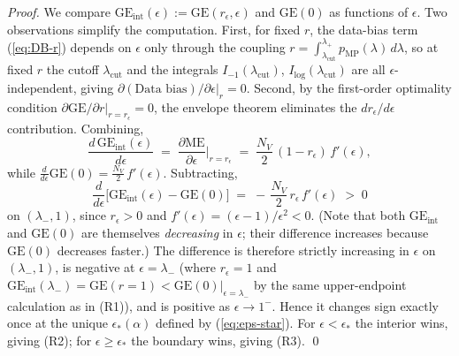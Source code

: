 \documentclass[10pt,a4paper]{amsart}
\newcommand{\NV}{N_V}
\begin{document}
\begin{proof}
We compare $\mathrm{GE}_{\mathrm{int}}(\epsilon) :=
\mathrm{GE}(r_{\epsilon},\epsilon)$ and $\mathrm{GE}(0)$ as
functions of $\epsilon$. Two observations simplify the
computation. First, for fixed $r$, the data-bias term
(\ref{eq:DB-r}) depends on $\epsilon$ only through the
coupling $r = \int_{\lambda_{\mathrm{cut}}}^{\lambda_{+}}
p_{\mathrm{MP}}(\lambda)\,d\lambda$, so at fixed $r$ the cutoff
$\lambda_{\mathrm{cut}}$ and the integrals
$I_{-1}(\lambda_{\mathrm{cut}})$,
$I_{\log}(\lambda_{\mathrm{cut}})$ are all
$\epsilon$-independent, giving
$\partial(\text{Data bias})/\partial\epsilon\big|_{r} = 0$.
Second, by the first-order optimality condition
$\partial\mathrm{GE}/\partial r\big|_{r=r_{\epsilon}} = 0$, the
envelope theorem eliminates the $dr_{\epsilon}/d\epsilon$
contribution. Combining,
\begin{equation*}
  \frac{d\,\mathrm{GE}_{\mathrm{int}}(\epsilon)}{d\epsilon}
  \;=\;
  \frac{\partial \mathrm{ME}}{\partial \epsilon}\bigg|_{r = r_{\epsilon}}
  \;=\;
  \frac{\NV}{2}\,(1 - r_{\epsilon})\,f'(\epsilon),
\end{equation*}
while $\frac{d}{d\epsilon}\mathrm{GE}(0) = \frac{\NV}{2}\,f'(\epsilon)$.
Subtracting,
\begin{equation*}
  \frac{d}{d\epsilon}\big[\mathrm{GE}_{\mathrm{int}}(\epsilon) - \mathrm{GE}(0)\big]
  \;=\;
  -\,\frac{\NV}{2}\,r_{\epsilon}\,f'(\epsilon)
  \;>\; 0
\end{equation*}
on $(\lambda_{-}, 1)$, since $r_{\epsilon} > 0$ and
$f'(\epsilon) = (\epsilon - 1)/\epsilon^{2} < 0$. (Note that
both $\mathrm{GE}_{\mathrm{int}}$ and $\mathrm{GE}(0)$ are
themselves \emph{decreasing} in $\epsilon$; their difference
increases because $\mathrm{GE}(0)$ decreases faster.)
The difference is therefore strictly increasing in $\epsilon$
on $(\lambda_{-}, 1)$, is negative at $\epsilon = \lambda_{-}$
(where $r_{\epsilon} = 1$ and $\mathrm{GE}_{\mathrm{int}}(\lambda_{-}) =
\mathrm{GE}(r{=}1) < \mathrm{GE}(0)|_{\epsilon = \lambda_{-}}$
by the same upper-endpoint calculation as in (R1)), and is
positive as $\epsilon \to 1^{-}$. Hence it changes sign
exactly once at the unique $\epsilon_{*}(\alpha)$ defined by
(\ref{eq:eps-star}). For $\epsilon < \epsilon_{*}$ the interior
wins, giving (R2); for $\epsilon \geq \epsilon_{*}$ the
boundary wins, giving (R3).
\qed
\end{proof}
\end{document}

